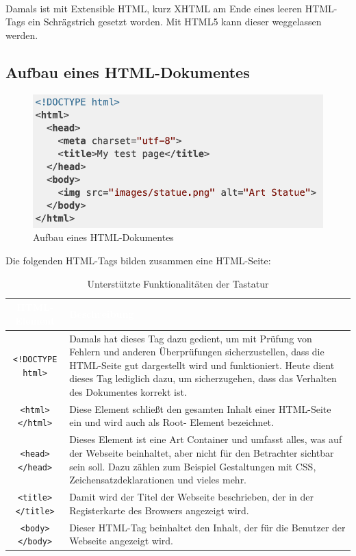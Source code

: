 \mbox{}\\
Damals ist mit Extensible HTML, kurz XHTML am Ende eines leeren HTML-Tags ein Schrägstrich gesetzt worden. Mit HTML5 kann dieser weggelassen werden. 

\subsection{Aufbau eines HTML-Dokumentes}

\begin{figure}[H]
	\begin{center}
		\includegraphics[scale=.7]{images/html-document-structure.png}
	\end{center}
		\caption{Aufbau eines HTML-Dokumentes}
\end{figure}

Die folgenden HTML-Tags bilden zusammen eine HTML-Seite:

\begin{table}[H]
	\begin{center}
	\begin{tabular}{| c | m{10cm} |}
		\hline
 		\cellcolor{Gray}\textcolor{White}{HTML-Element} & \cellcolor{Gray}\textcolor{White}{Beschreibung}  \\
		\hline
		\texttt{<!DOCTYPE html>} & Damals hat dieses Tag dazu gedient, um mit Prüfung von Fehlern und anderen 
			Überprüfungen sicherzustellen, dass die HTML-Seite gut dargestellt wird und funktioniert. Heute dient dieses Tag 
			lediglich dazu, um sicherzugehen, dass das Verhalten des Dokumentes korrekt ist.\\
		\hline
		\texttt{<html></html>} & Diese Element schließt den gesamten Inhalt einer HTML-Seite ein und wird auch als Root-
			Element bezeichnet.\\
		\hline
		\texttt{<head></head>} & Dieses Element ist eine Art Container und umfasst alles, was auf der Webseite beinhaltet, 
			aber nicht für den Betrachter sichtbar sein soll. Dazu zählen zum Beispiel Gestaltungen mit CSS, 
			Zeichensatzdeklarationen und vieles mehr.\\
		\hline
		\texttt{<title></title>} & Damit wird der Titel der Webseite beschrieben, der in der Registerkarte des Browsers angezeigt 
			wird.\\
		\hline
		\texttt{<body></body>} & Dieser HTML-Tag beinhaltet den Inhalt, der für die Benutzer der Webseite angezeigt wird. \\
		\hline
	\end{tabular}
	\end{center}
	\caption{Unterstützte Funktionalitäten der Tastatur}
\end{table}

